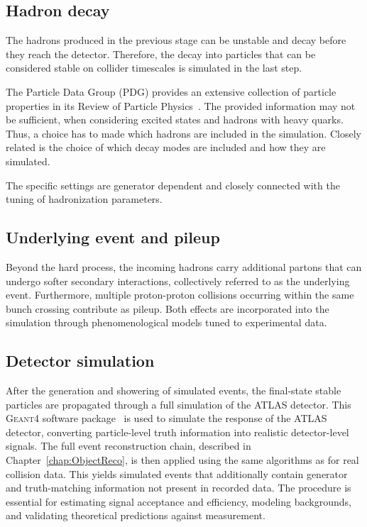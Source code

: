 \subsection{Hadron decay}

The hadrons produced in the previous stage can be unstable and decay
before they reach the detector. Therefore, the decay into particles that
can be considered stable on collider timescales is simulated in the last step.

The Particle Data Group (PDG) provides an extensive collection of particle
properties in its Review of Particle Physics~\cite{PhysRevD.110.030001}.
The provided information may not be sufficient,
when considering excited states and hadrons with heavy quarks.
Thus, a choice has to made which hadrons are included in the simulation.
Closely related is the choice of which decay modes are included and how they are simulated.

The specific settings are generator dependent and
closely connected with the tuning of hadronization parameters.


\subsection{Underlying event and pileup}

Beyond the hard process, the incoming hadrons carry additional partons that can undergo softer secondary interactions, collectively referred to as the underlying event. 
Furthermore, multiple proton-proton collisions occurring within the same bunch crossing contribute as pileup.
Both effects are incorporated into the simulation through phenomenological models tuned to experimental data.

\subsection{Detector simulation}

After the generation and showering of simulated events, the final-state stable particles are propagated through a full simulation of the ATLAS detector. 
This  \textsc{Geant}4 software package~\cite{Agostinelli:2002hh} is used to 
simulate the response of the ATLAS detector, 
converting particle-level truth information into realistic detector-level signals.
The full event reconstruction chain, described in Chapter~\ref{chap:ObjectReco}, is then applied using the same algorithms as for real collision data. This yields simulated events that additionally contain generator and truth-matching information not present in recorded data. The procedure is essential for estimating signal acceptance and efficiency, modeling backgrounds, and validating theoretical predictions against measurement.

